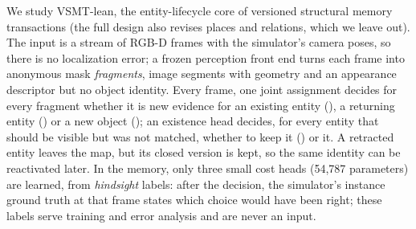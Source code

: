 We study VSMT-lean, the entity-lifecycle core of versioned structural memory transactions (the full design also revises places and relations, which we leave out).
The input is a stream of RGB-D frames with the simulator's camera poses, so there is no localization error; a frozen perception front end turns each frame into anonymous mask \emph{fragments}, image segments with geometry and an appearance descriptor but no object identity.
Every frame, one joint assignment decides for every fragment whether it is new evidence for an existing entity (), a returning entity () or a new object (); an existence head decides, for every entity that should be visible but was not matched, whether to keep it () or  it.
A retracted entity leaves the map, but its closed version is kept, so the same identity can be reactivated later.
In the memory, only three small cost heads (54,787 parameters) are learned, from \emph{hindsight} labels: after the decision, the simulator's instance ground truth at that frame states which choice would have been right; these labels serve training and error analysis and are never an input.

